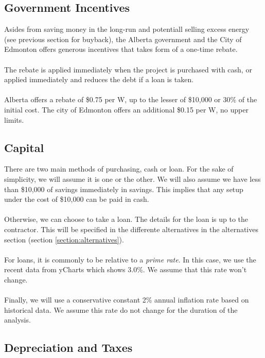 \documentclass[10pt,letterpaper]{article}
\begin{document}
\subsection{Government Incentives}\label{subsection:rebate}

Asides from saving money in the long-run and potentiall selling excess energy (see previous section for buyback), the Alberta government and the City of Edmonton offers generous incentives that takes form of a one-time rebate.\cite{kuby-costs,kuby-edmonton,kuby-alberta}\\
\\
The rebate is applied immediately when the project is purchased with cash, or applied immediately and reduces the debt if a loan is taken.\\
\\
Alberta offers a rebate of \$0.75 per W, up to the lesser of \$10,000 or 30\% of the initial cost\cite{kuby-alberta}. The city of Edmonton offers an additional \$0.15 per W, no upper limits.\\

\subsection{Capital}\label{subsection:capital}

There are two main methods of purchasing, cash or loan. For the sake of simplicity, we will assume it is one or the other. We will also assume we have less than \$10,000 of savings immediately in savings. This implies that any setup under the cost of \$10,000 can be paid in cash.\\
\\
Otherwise, we can choose to take a loan. The details for the loan is up to the contractor. This will be specified in the differente alternatives in the alternatives section (section \ref{section:alternatives}).\\
\\
For loans, it is commonly to be relative to a \textit{prime rate}. In this case, we use the recent data from yCharts which shows 3.0\%.\cite{prime-rate} We assume that this rate won't change.\\
\\
Finally, we will use a conservative constant 2\% annual inflation rate based on historical data.\cite{inflation} We assume this rate do not change for the duration of the analysis.\\

\subsection{Depreciation and Taxes}
\end{document}
